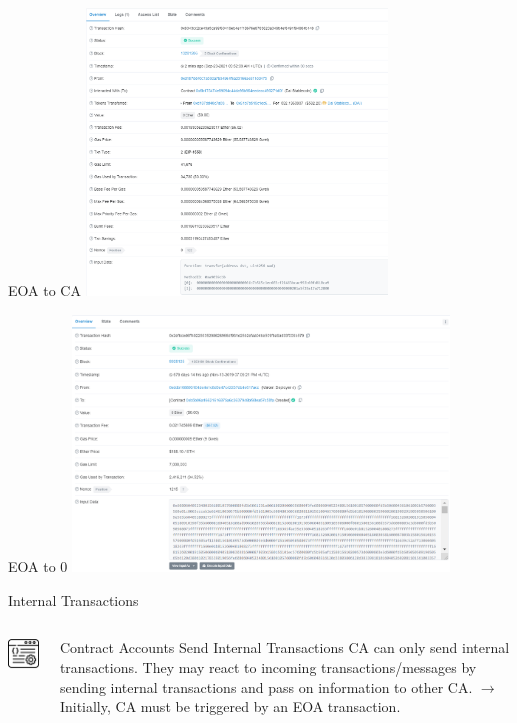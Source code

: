 \documentclass[handout]{beamer}
\begin{document}
\begin{frame}{EOA to CA}
\center
\includegraphics[width=8cm]{../assets/images/EOA_to_CA}

\end{frame}

\begin{frame}{EOA to 0}
\center
\includegraphics[width=10cm]{../assets/images/EOA_to_0}


\end{frame}

\begin{frame}{Internal Transactions}
\begin{columns}[T]
	\begin{column}{0.35\textwidth}
		\includegraphics[width=3cm]{../assets/images/CA}
		\end{column} %
	\begin{column}{0.65\textwidth}
		\begin{alertblock}{Contract Accounts Send Internal Transactions}
				CA can only send internal transactions. They may react to incoming transactions/messages by sending internal transactions and pass on information to other CA. $\rightarrow$ Initially, CA must be triggered by an EOA transaction.
		\end{alertblock}
	\end{column}
\end{columns}

\end{frame}
\end{document}
